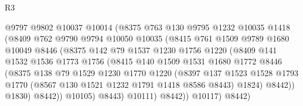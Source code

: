 \begin{lexlean}{R3}
\begin{coremodule}
                        @9797
                        @9802
                        @10037
                        @10014
                        (@8375
                          @763
                          @130
                          @9795
                          @1232
                          @10035
                          @1418
                          (@8409
                            @762
                            @9790
                            @9794
                            @10050
                            @10035
                            (@8415
                              @761
                              @1509
                              @9789
                              @1680
                              @10049
                              @8446
                              (@8375
                                @142
                                @79
                                @1537
                                @1230
                                @1756
                                @1220
                                (@8409
                                  @141
                                  @1532
                                  @1536
                                  @1773
                                  @1756
                                  (@8415
                                    @140
                                    @1509
                                    @1531
                                    @1680
                                    @1772
                                    @8446
                                    (@8375
                                      @138
                                      @79
                                      @1529
                                      @1230
                                      @1770
                                      @1220
                                      (@8397
                                        @137
                                        @1523
                                        @1528
                                        @1793
                                        @1770
                                        (@8567 @130 @1521 @1232 @1791 @1418 @8586 @8443)
                                        @1824)
                                      @8442))
                                  @1830)
                                @8442))
                            @10105)
                          @8443)
                        @10111)
                      @8442))
                  @10117)
                @8442)

\end{coremodule}
\end{lexlean}
